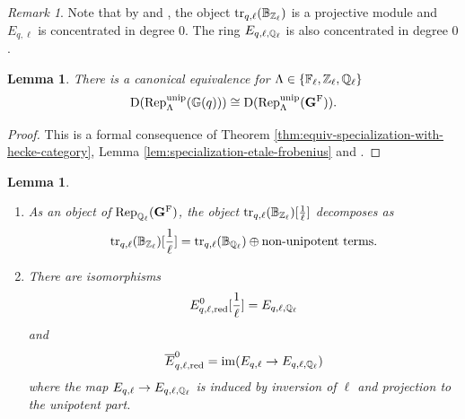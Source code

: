 \documentclass[a4paper, 10pt, oneside, reqno]{amsart}
\theoremstyle{plain}
\newtheorem{lem}[thm]{Lemma}
\theoremstyle{definition}
\theoremstyle{remark}
\newtheorem{rque}[thm]{Remark}
\newcommand{\Gbb}{\mathbb{G}}
\begin{document}
\begin{rque}\label{rmk:tilting-sheaves-are-projective}
Note that by \cite[Theorem 1.2.4]{EteveTilting} and \cite[Theorem 4.91]{ZhuCategoricalTame}, the object $\mathrm{tr}_{q,\ell}(\mathbb{B}_{\mathbb{Z}_{\ell}})$ is a projective module and $E_{q,\ell}$ is concentrated in degree $0$. The ring $E_{q, \ell, \mathbb{Q}_{\ell}}$ is also concentrated in degree $0$. 
\end{rque} 

\begin{lem}\label{lem:etale-specialization-for-representations}
There is a canonical equivalence for $\Lambda \in \{\mathbb{F}_{\ell}, \mathbb{Z}_{\ell},\mathbb{Q}_{\ell}\}$
$$\DD(\Rep_{\Lambda}^{\unip}(\Gbb(q))) \cong \DD(\Rep_{\Lambda}^{\unip}(\Gbf^{\Frob})).$$
\end{lem}

\begin{proof}
This is a formal consequence of Theorem \ref{thm:equiv-specialization-with-hecke-category}, Lemma \ref{lem:specialization-etale-frobenius} and \cite[Theorem 1.3.1]{EteveFreeMono}.
\end{proof}

\begin{lem}\label{lem:control-of-ell-torsion}
\begin{enumerate}
\item As an object of $\mathrm{Rep}_{\mathbb{Q}_{\ell}}(\mathbf{G}^{\mathrm{F}})$, the object $\mathrm{tr}_{q,\ell}(\mathbb{B}_{\mathbb{Z}_{\ell}})[\frac{1}{\ell}]$ decomposes as 
$$\mathrm{tr}_{q,\ell}(\mathbb{B}_{\mathbb{Z}_{\ell}})[\frac{1}{\ell}] = \mathrm{tr}_{q,\ell}(\mathbb{B}_{\mathbb{Q}_{\ell}}) \oplus \text{non-unipotent terms}.$$
\item There are isomorphisms 
$$E^0_{q,\ell, \mathrm{red}}[\frac{1}{\ell}] = E_{q, \ell, \mathbb{Q}_{\ell}}$$
and
$$\overline{E}^0_{q,\ell, \mathrm{red}} = \mathrm{im}(E_{q,\ell} \to E_{q, \ell, \mathbb{Q}_{\ell}})$$
where the map $E_{q,\ell} \to E_{q, \ell, \mathbb{Q}_{\ell}}$ is induced by inversion of $\ell$ and projection to the unipotent part.
\end{enumerate}
\end{lem}
\end{document}
